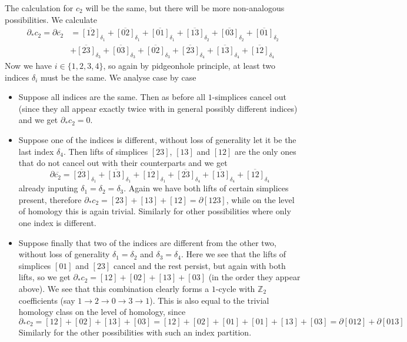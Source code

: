 \documentclass[a4paper, 12pt]{article}
\newcommand{\Z}{\mathbb{Z}}
\begin{document}
\begin{enumerate}
	 The calculation for $c_2$ will be the same, but there will be more non-analogous possibilities. We calculate
	 \begin{align*}
	 \partial_* c_2 = \partial\overline{c_2} &= \overline{[12]}_{\delta_1} + \overline{[02]}_{\delta_1} + \overline{[01]}_{\delta_1} + \overline{[13]}_{\delta_2} + \overline{[03]}_{\delta_2} + \overline{[01]}_{\delta_2} \\
	 &+ \overline{[23]}_{\delta_3} + \overline{[03]}_{\delta_3} + \overline{[02]}_{\delta_3} + \overline{[23]}_{\delta_4} + \overline{[13]}_{\delta_4} + \overline{[12]}_{\delta_4}
	 \end{align*}
	 Now we have $i \in \lbrace 1, 2, 3, 4 \rbrace$, so again by pidgeonhole principle, at least two indices $\delta_i$ must be the same. We analyse case by case
	 \begin{itemize}
	 	\item Suppose all indices are the same. Then as before all $1$-simplices cancel out (since they all appear exactly twice with in general possibly different indices) and we get $\partial_* c_2 = 0$.
	 	\item Suppose one of the indices is different, without loss of generality let it be the last index $\delta_4$. Then lifts of simplices $[23]$, $[13]$ and $[12]$ are the only ones that do not cancel out with their counterparts and we get
	 	\[
	 	\partial\overline{c_2} =\overline{[23]}_{\delta_1} + \overline{[13]}_{\delta_1} + \overline{[12]}_{\delta_1} + \overline{[23]}_{\delta_4} + \overline{[13]}_{\delta_4} + \overline{[12]}_{\delta_4}
	 	\]
	 	already inputing $\delta_1 = \delta_2 = \delta_3$. Again we have both lifts of certain simplices present, therefore $\partial_* c_2 = [23] + [13] + [12] = \partial [123]$, while on the level of homology this is again trivial. Similarly for other possibilities where only one index is different.
	 	\item Suppose finally that two of the indices are different from the other two, without loss of generality $\delta_1 = \delta_2$ and $\delta_3 = \delta_4$. Here we see that the lifts of simplices $[01]$ and $[23]$ cancel and the rest persist, but again with both lifts, so we get $\partial_* c_2 = [12] + [02] + [13] + [03]$ (in the order they appear above). We see that this combination clearly forms a $1$-cycle with $\Z_2$ coefficients (say $1 \to 2 \to 0 \to 3 \to 1$). This is also equal to the trivial homology class on the level of homology, since
	 	\[
	 	\partial_* c_2 = [12] + [02] + [13] + [03] = [12] + [02] + [01] + [01] + [13] + [03] = \partial [012] + \partial [013]
	 	\]
	 	Similarly for the other possibilities with such an index partition.
	\end{itemize}
 	

\end{enumerate}
\end{document}
